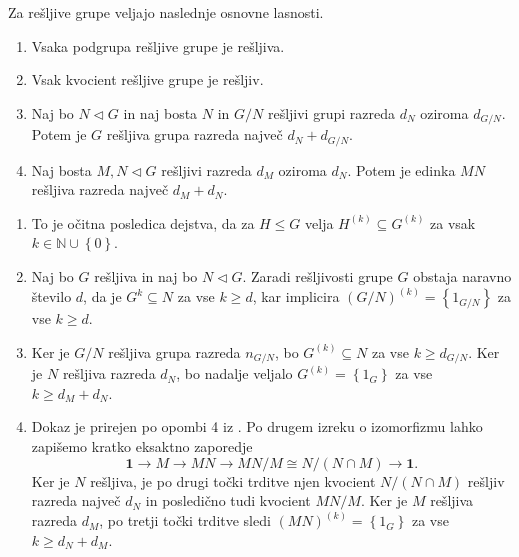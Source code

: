 \documentclass[mat1, tisk]{fmfdelo}
\numberwithin{equation}{section}  %
\begin{document}
    \begin{trditev}
    \label{trd_lastnosti_resljivih_grup}
    Za rešljive grupe veljajo naslednje osnovne lasnosti.
     \begin{enumerate}
        \item Vsaka podgrupa rešljive grupe je rešljiva.
        \item Vsak kvocient rešljive grupe je rešljiv.
        \item Naj bo $N \triangleleft G$ in naj bosta $N$ in $G / N$ rešljivi grupi razreda $d_{N}$ oziroma $d_{G / N}$. Potem je $G$ rešljiva grupa razreda največ $d_N + d_{G / N}$.
        \item Naj bosta $M, N \triangleleft G$ rešljivi razreda $d_M$ oziroma $d_N$. Potem je edinka $MN$ rešljiva razreda največ $d_M + d_N$.   
     \end{enumerate}
    \end{trditev}
    \begin{dokaz}
        \begin{enumerate}
            \item To je očitna posledica dejstva, da za $H \le G$ velja $H^{(k)} \subseteq G^{(k)}$ za vsak $k \in \mathbb{N} \cup \left\{ 0\right\}$.
            \item Naj bo $G$ rešljiva in naj bo $N \triangleleft G$. Zaradi rešljivosti grupe $G$ obstaja naravno število $d$, da je $G^{k} \subseteq N$ za vse $k \ge d$, kar implicira $ (G / N)^{(k)} = \left\{ 1_{G / N}\right\}$ za vse $k \ge d$. 
            \item Ker je $G / N$ rešljiva grupa razreda $n_{G / N}$, bo $G^{(k)} \subseteq N$ za vse $k \ge d_{G / N}$. Ker je $N$ rešljiva razreda $d_N$, bo nadalje veljalo $G^{(k)} = \left\{ 1_G\right\}$ za vse $k \ge d_M + d_N$.
            \item Dokaz je prirejen po opombi 4 iz \cite[str.4]{Schneider_2016}. Po drugem izreku o izomorfizmu lahko zapišemo kratko eksaktno zaporedje \begin{equation*}
            \mathbf{1} \to M \to MN \to MN / M \cong N / (N \cap M) \to \mathbf{1}.
            \end{equation*}  
            Ker je $N$ rešljiva, je po drugi točki trditve  njen kvocient $ N / (N \cap M)$ rešljiv razreda največ $d_N$ in posledično tudi kvocient $ MN / M $. Ker je $M$ rešljiva razreda $d_M$, po tretji točki trditve sledi $(MN)^{(k)} = \left\{ 1_{G}\right\}$ za vse $k \ge d_N + d_M$.
        \end{enumerate}
    \end{dokaz}
\end{document}
